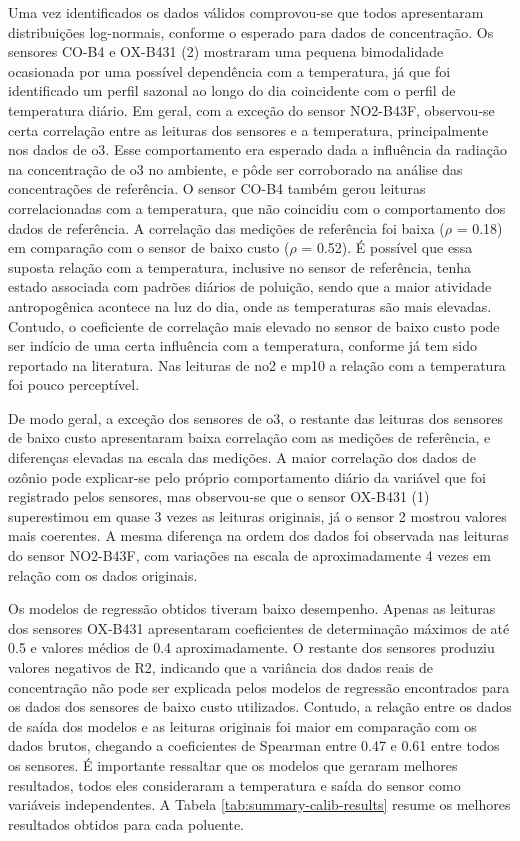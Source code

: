 Uma vez identificados os dados válidos comprovou-se que todos apresentaram distribuições log-normais, conforme o esperado para dados de concentração. Os sensores CO-B4 e OX-B431 (2) mostraram uma pequena bimodalidade ocasionada por uma possível dependência com a temperatura, já que foi identificado um perfil sazonal ao longo do dia coincidente com o perfil de temperatura diário. Em geral, com a exceção do sensor NO2-B43F, observou-se certa correlação entre as leituras dos sensores e a temperatura, principalmente nos dados de \acrshort{o3}. Esse comportamento era esperado dada a influência da radiação na concentração de \acrshort{o3} no ambiente, e pôde ser corroborado na análise das concentrações de referência. O sensor CO-B4 também gerou leituras correlacionadas com a temperatura, que não coincidiu com o comportamento dos dados de referência. A correlação das medições de referência foi baixa ($\rho$ = 0.18) em comparação com o sensor de baixo custo ($\rho$ = 0.52). É possível que essa suposta relação com a temperatura, inclusive no sensor de referência, tenha estado associada com padrões diários de poluição, sendo que a maior atividade antropogênica acontece na luz do dia, onde as temperaturas são mais elevadas. Contudo, o coeficiente de correlação mais elevado no sensor de baixo custo pode ser indício de uma certa influência com a temperatura, conforme já tem sido reportado na literatura. Nas leituras de \acrshort{no2} e \acrshort{mp10} a relação com a temperatura foi pouco perceptível.

De modo geral, a exceção dos sensores de \acrshort{o3}, o restante das leituras dos sensores de baixo custo apresentaram baixa correlação com as medições de referência, e diferenças elevadas na escala das medições. A maior correlação dos dados de ozônio pode explicar-se pelo próprio comportamento diário da variável que foi registrado pelos sensores, mas observou-se que o sensor OX-B431 (1) superestimou em quase 3 vezes as leituras originais, já o sensor 2 mostrou valores mais coerentes. A mesma diferença na ordem dos dados foi observada nas leituras do sensor NO2-B43F, com variações na escala de aproximadamente 4 vezes em relação com os dados originais.

Os modelos de regressão obtidos tiveram baixo desempenho. Apenas as leituras dos sensores OX-B431 apresentaram coeficientes de determinação máximos de até 0.5 e valores médios de 0.4 aproximadamente. O restante dos sensores produziu valores negativos de R2, indicando que a variância dos dados reais de concentração não pode ser explicada pelos modelos de regressão encontrados para os dados dos sensores de baixo custo utilizados. Contudo, a relação entre os dados de saída dos modelos e as leituras originais foi maior em comparação com os dados brutos, chegando a coeficientes de Spearman entre 0.47 e 0.61 entre todos os sensores. É importante ressaltar que os modelos que geraram melhores resultados, todos eles consideraram a temperatura e saída do sensor como variáveis independentes. A Tabela \ref{tab:summary-calib-results} resume os melhores resultados obtidos para cada poluente.

